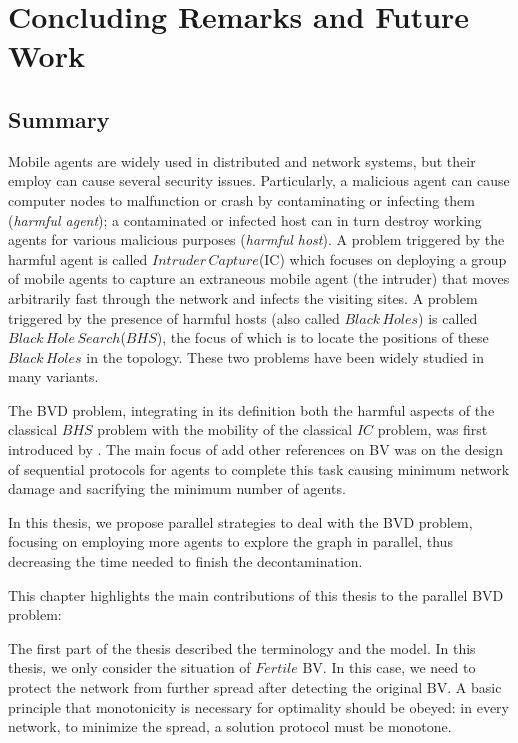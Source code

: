 \chapter {Concluding Remarks and Future Work}
\label{INTRO}

\section{Summary}
Mobile agents are widely used in distributed and network systems, but  their employ can cause several security issues. Particularly, a malicious agent can cause computer nodes to malfunction or crash by contaminating or infecting them ({\em harmful agent}); a contaminated or infected host can  in turn destroy working agents for various malicious purposes ({\em harmful host}). A problem triggered by the harmful agent is called $Intruder\,Capture$(IC) which focuses on deploying a group of mobile agents to capture an extraneous mobile agent (the intruder) that moves arbitrarily fast through the network and infects the visiting sites. A problem triggered by the presence of  harmful hosts (also called $Black\,Holes$) is called $Black\, Hole\,Search$($BHS$), the focus of which is to locate the positions of these  $Black\,Holes$ in the topology. These two problems have been widely studied in many variants.

The BVD problem, integrating in its definition both the harmful aspects of the classical $BHS$ problem with the mobility of the classical $IC$ problem, was first introduced by \cite{cai}. The main focus of \cite{alotaibi,cai,cai1} \color{blue} add other references on BV \color{black} was   on the  design of sequential protocols for agents to complete this task   causing minimum network damage and   sacrifying the  minimum number of agents.  

In this thesis, we propose parallel strategies to deal with the BVD problem, focusing on employing more agents to explore the graph in parallel, thus decreasing the time needed to finish the decontamination.

This chapter highlights the main contributions of this thesis to the parallel BVD problem:

The first part of the thesis described the terminology and the model. In this thesis, we only consider the situation of $Fertile$ BV. In this case, we need to protect the network from further spread after detecting the original BV. A basic principle that monotonicity is necessary for optimality should be obeyed: in every network, to minimize the spread, a solution protocol must be monotone. 

